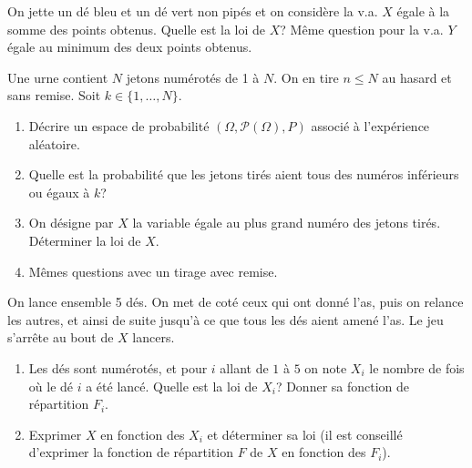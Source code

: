\documentclass[a4paper,12pt,reqno]{amsart}
\begin{document}


\begin{exo}

  On jette un dé bleu et un dé vert non pipés et on considère la v.a. $X$ égale à
  la somme des points obtenus. Quelle est la loi de $X$? Même question pour la v.a. $Y$ égale au minimum des deux points obtenus.

\end{exo}

\begin{exo}

  Une urne contient $N$ jetons numérotés de 1 à $N$. On en tire $n\leq N$ au hasard et sans remise. Soit $k\in \{1,\ldots,N\}$.

  \begin{enumerate}
    \item Décrire  un espace de probabilité $(\Omega,\mathcal{P}(\Omega),P)$  associé à l'expérience aléatoire.
    \item Quelle est la probabilité que les jetons tirés aient tous des numéros inférieurs ou égaux à $k$?
    \item On désigne par $X$ la variable égale au plus grand numéro des jetons tirés. Déterminer la loi de $X$.
    \item Mêmes questions avec un tirage avec remise.
  \end{enumerate}

\end{exo}

\begin{exo}

  On lance ensemble 5 dés. On met de coté ceux qui ont donné l'as, puis on relance les autres, et ainsi de suite jusqu'à ce que tous les dés aient amené l'as. Le jeu s'arrête au bout de $ X $ lancers.

  \begin{enumerate}
    \item Les dés sont numérotés, et pour $ i $ allant de $ 1 $ à $ 5 $ on note $ X_i $ le nombre de fois où le dé $ i $ a été lancé. Quelle est la loi de $ X_i $? Donner sa fonction de répartition $ F_i $.
    \item Exprimer $ X $ en fonction des $ X_i $ et déterminer sa loi (il est conseillé d'exprimer la fonction de répartition $ F $ de $ X $ en fonction des $ F_i $).
  \end{enumerate}

\end{exo}
\end{document}
